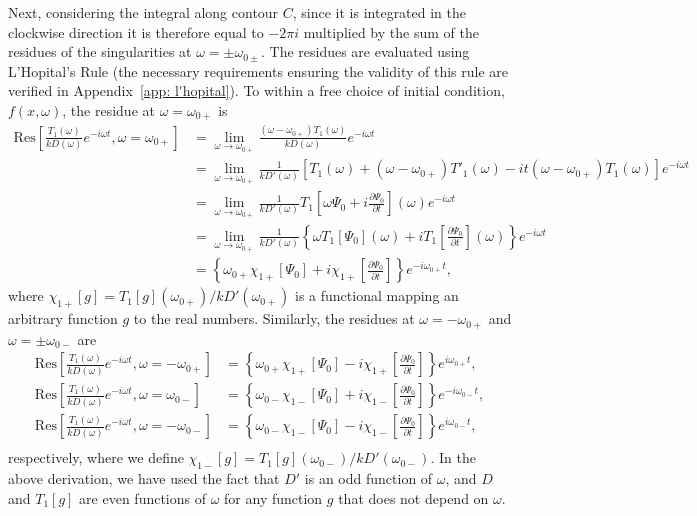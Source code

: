 \documentclass{aastex61}
\begin{document}
Next, considering the integral along contour $C$, since it is integrated in the clockwise direction it is therefore equal to $-2\pi i$ multiplied by the sum of the residues of the singularities at $\omega = \pm \omega_{0\pm}$. The residues are evaluated using L'Hopital's Rule (the necessary requirements ensuring the validity of this rule are verified in Appendix~\ref{app: l'hopital}). To within a free choice of initial condition, $f(x,\omega)$, the residue at $\omega = \omega_{0+}$ is
\begin{align}
\mathrm{Res}\left[\frac{T_1(\omega)}{kD(\omega)}e^{-i\omega t}, \omega = \omega_{0+} \right] &= 
\lim_{\omega \to \omega_{0+}} \frac{(\omega - \omega_{0+})T_1(\omega)}{kD(\omega)} e^{-i\omega t} \\ 
&= \lim_{\omega \to \omega_{0+}} \frac{1}{kD'(\omega)} [T_1(\omega) + (\omega - \omega_{0+})T'_1(\omega) - it(\omega - \omega_{0+})T_1(\omega)]e^{-i\omega t} \\
&= \lim_{\omega \to \omega_{0+}} \frac{1}{kD'(\omega)} T_1\left[\omega \Psi_0 + i\frac{\partial \Psi_0}{\partial t}\right](\omega) e^{-i\omega t} \\
&= \lim_{\omega \to \omega_{0+}} \frac{1}{kD'(\omega)} \left\{ \omega T_1[\Psi_0](\omega) + iT_1\left[\frac{\partial \Psi_0}{\partial t}\right](\omega) \right\} e^{-i\omega t} \\
&= \left\{ \omega_{0+} \chi_{1+}[\Psi_0] + i\chi_{1+}\left[\frac{\partial \Psi_0}{\partial t}\right] \right\} e^{-i\omega_{0+} t},
\end{align}
where $\chi_{1+}[g] = T_1[g](\omega_{0+}) / kD'(\omega_{0+})$ is a functional mapping an arbitrary function $g$ to the real numbers. Similarly, the residues at $\omega = -\omega_{0+}$ and $\omega = \pm\omega_{0-}$ are
\begin{align}
\mathrm{Res}\left[\frac{T_1(\omega)}{kD(\omega)}e^{-i\omega t}, \omega = -\omega_{0+} \right] &= \left\{ \omega_{0+} \chi_{1+}[\Psi_0] - i\chi_{1+}\left[\frac{\partial \Psi_0}{\partial t}\right] \right\} e^{i\omega_{0+} t}, \\
\mathrm{Res}\left[\frac{T_1(\omega)}{kD(\omega)}e^{-i\omega t}, \omega = \omega_{0-} \right] &= \left\{ \omega_{0-} \chi_{1-}[\Psi_0] + i\chi_{1-}\left[\frac{\partial \Psi_0}{\partial t}\right] \right\} e^{-i\omega_{0-} t}, \\
\mathrm{Res}\left[\frac{T_1(\omega)}{kD(\omega)}e^{-i\omega t}, \omega = -\omega_{0-} \right] &= \left\{ \omega_{0-} \chi_{1-}[\Psi_0] - i\chi_{1-}\left[\frac{\partial \Psi_0}{\partial t}\right] \right\} e^{i\omega_{0-} t}, \\
\end{align}
respectively, where we define $\chi_{1-}[g] = T_1[g](\omega_{0-}) / kD'(\omega_{0-})$. In the above derivation, we have used the fact that $D'$ is an odd function of $\omega$, and $D$ and $T_1[g]$ are even functions of $\omega$ for any function $g$ that does not depend on $\omega$.
\end{document}
